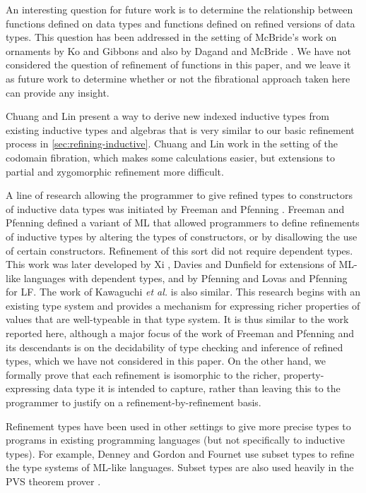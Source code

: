 \documentclass{LMCS}
\begin{document}
An interesting question for future work is to determine the
relationship between functions defined on data types and functions
defined on refined versions of data types. This question has been
addressed in the setting of McBride's work on ornaments by Ko and
Gibbons \cite{KoGibbons2011OAOAOO} and also by Dagand and McBride
\cite{DagandMcBride2012funOrn}. We have not considered the question of
refinement of functions in this paper, and we leave it as future work
to determine whether or not the fibrational approach taken here can
provide any insight.

Chuang and Lin \cite{chuang06algebra} present a way to derive new
indexed inductive types from existing inductive types and algebras
that is very similar to our basic refinement process in
\autoref{sec:refining-inductive}. Chuang and Lin work in the setting
of the codomain fibration, which makes some calculations easier, but
extensions to partial and zygomorphic refinement more difficult.

A line of research allowing the programmer to give refined types to
constructors of inductive data types was initiated by Freeman and
Pfenning \cite{freeman91refinement}. Freeman and Pfenning defined a
variant of ML that allowed programmers to define refinements of
inductive types by altering the types of constructors, or by
disallowing the use of certain constructors. Refinement of this sort
did not require dependent types. This work was later developed by Xi
\cite{xi00dependently}, Davies \cite{davies05practical} and Dunfield
\cite{dunfield07unified} for extensions of ML-like languages with
dependent types, and by Pfenning \cite{pfenning93refinement} and Lovas
and Pfenning \cite{lovas10refinement} for LF. The work of Kawaguchi
\emph{et al.}  \cite{kawaguchi09type} is also similar. This research
begins with an existing type system and provides a mechanism for
expressing richer properties of values that are well-typeable in that
type system.  It is thus similar to the work reported here, although a
major focus of the work of Freeman and Pfenning and its descendants is
on the decidability of type checking and inference of refined types,
which we have not considered in this paper. On the other hand, we
formally prove that each refinement is isomorphic to the richer,
property-expressing data type it is intended to capture, rather than
leaving this to the programmer to justify on a
refinement-by-refinement basis.

Refinement types have been used in other settings to give more precise
types to programs in existing programming languages (but not
specifically to inductive types). For example, Denney
\cite{denney98refinement} and Gordon and Fournet
\cite{gordon09principles} use subset types to refine the type systems
of ML-like languages. Subset types are also used heavily in the PVS
theorem prover \cite{rushby98subtypes}.
\end{document}
